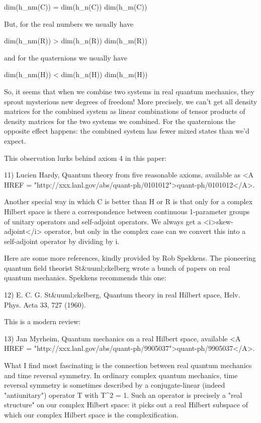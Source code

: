 dim(h_{nm}(C)) = dim(h_{n}(C)) dim(h_{m}(C))

But, for the real numbers we usually have

dim(h_{nm}(R)) > dim(h_{n}(R)) dim(h_{m}(R))

and for the quaternions we usually have

dim(h_{nm}(H)) < dim(h_{n}(H)) dim(h_{m}(H))

So, it seems that when we combine two systems in real quantum
mechanics, they sprout mysterious new degrees of freedom!  More
precisely, we can't get all density matrices for the combined system
as linear combinations of tensor products of density matrices for the
two systems we combined.  For the quaternions the opposite effect
happens: the combined system has fewer mixed states than we'd expect.

This observation lurks behind axiom 4 in this paper:

11) Lucien Hardy, Quantum theory from five reasonable axioms, 
available as <A HREF = "http://xxx.lanl.gov/abs/quant-ph/0101012">quant-ph/0101012</A>.

Another special way in which C is better than H or R is that
only for a complex Hilbert space is there a correspondence between
continuous 1-parameter groups of unitary operators and self-adjoint
operators.  We always get a <i>skew-adjoint</i> operator, but only
in the complex case can we convert this into a self-adjoint operator
by dividing by i.  

Here are some more references, kindly provided by Rob Spekkens.  The 
pioneering quantum field theorist St&uuml;ckelberg wrote a bunch of papers 
on real quantum mechanics.  Spekkens recommends this one:

12) E. C. G. St&uuml;ckelberg, Quantum theory in real Hilbert space,
Helv. Phys. Acta 33, 727 (1960).

This is a modern review:

13) Jan Myrheim, Quantum mechanics on a real Hilbert space, available
<A HREF = "http://xxx.lanl.gov/abs/quant-ph/9905037">quant-ph/9905037</A>.

What I find most fascinating is the connection between real quantum
mechanics and time reversal symmetry.  In ordinary complex quantum
mechanics, time reversal symmetry is sometimes described by a
conjugate-linear (indeed "antiunitary") operator T with
T^{2} = 1.  Such an operator is precisely a "real
structure" on our complex Hilbert space: it picks out a real
Hilbert subspace of which our complex Hilbert space is the
complexification.

